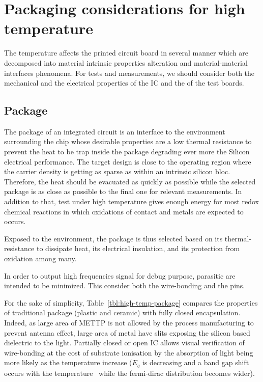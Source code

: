 
\chapter{Packaging considerations for high temperature}
\label{app:Packaging}

The temperature affects the printed circuit board in several manner which are decomposed into material intrinsic properties alteration and material-material interfaces phenomena. For tests and measurements, we should consider both the mechanical and the electrical properties of the IC and the of the test boards.

\section{Package}
The package of an integrated circuit is an interface to the environment surrounding the chip whose desirable properties are a low thermal resistance to prevent the heat to be trap inside the package degrading ever more the Silicon electrical performance. The target design is close to the operating region where the carrier density is getting as sparse as within an intrinsic silicon bloc.
Therefore, the heat should be evacuated as quickly as possible while the selected package is as close as possible to the final one for relevant measurements. In addition to that, test under high temperature gives enough energy for most redox chemical reactions in which oxidations of contact and metals are expected to occurs.

Exposed to the environment, the package is thus selected based on its thermal-resistance to dissipate heat, its electrical insulation, and its protection from oxidation among many.

In order to output high frequencies signal for debug purpose, parasitic are intended to be minimized. This consider both the wire-bonding and the pins.

For the sake of simplicity, Table~\ref{tbl:high-temp-package} compares the properties of traditional package (plastic and ceramic) with fully closed encapsulation. Indeed, as large area of METTP is not allowed by the process manufacturing to prevent antenna effect, large area of metal have slits exposing the silicon based dielectric to the light. Partially closed or open IC allows visual verification of wire-bonding at the cost of substrate ionisation by the absorption of light being more likely as the temperature increase (\(E_g\) is decreasing and a band gap shift occurs with the temperature~\cite{Lautenschlager1985,Klenner1992} while the fermi-dirac distribution becomes wider).

